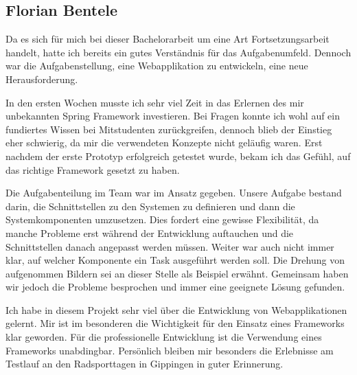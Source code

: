\subsection{Florian Bentele}
Da es sich für mich bei dieser Bachelorarbeit um eine Art Fortsetzungsarbeit handelt, hatte ich bereits ein gutes Verständnis für das Aufgabenumfeld. Dennoch war die Aufgabenstellung, eine Webapplikation zu entwickeln, eine neue Herausforderung.

In den ersten Wochen musste ich sehr viel Zeit in das Erlernen des mir unbekannten Spring Framework investieren. Bei Fragen konnte ich wohl auf ein fundiertes Wissen bei Mitstudenten zurückgreifen, dennoch blieb der Einstieg eher schwierig, da mir die verwendeten Konzepte nicht geläufig waren. Erst nachdem der erste Prototyp erfolgreich getestet wurde, bekam ich das Gefühl, auf das richtige Framework gesetzt zu haben.

Die Aufgabenteilung im Team war im Ansatz gegeben. Unsere Aufgabe bestand darin, die Schnittstellen zu den Systemen zu definieren und dann die Systemkomponenten umzusetzen. Dies fordert eine gewisse Flexibilität, da manche Probleme erst während der Entwicklung auftauchen und die Schnittstellen danach angepasst werden müssen. Weiter war auch nicht immer klar, auf welcher Komponente ein Task ausgeführt werden soll. Die Drehung von aufgenommen Bildern sei an dieser Stelle als Beispiel erwähnt. Gemeinsam haben wir jedoch die Probleme besprochen und immer eine geeignete Lösung gefunden.

Ich habe in diesem Projekt sehr viel über die Entwicklung von Webapplikationen gelernt. Mir ist im besonderen die Wichtigkeit für den Einsatz eines Frameworks klar geworden. Für die professionelle Entwicklung ist die Verwendung eines Frameworks unabdingbar. Persönlich bleiben mir besonders die Erlebnisse am Testlauf an den Radsporttagen in Gippingen in guter Erinnerung.
